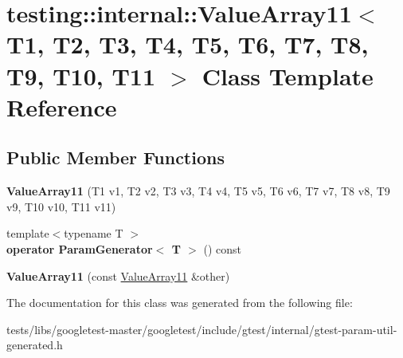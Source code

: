 \hypertarget{classtesting_1_1internal_1_1ValueArray11}{}\section{testing\+:\+:internal\+:\+:Value\+Array11$<$ T1, T2, T3, T4, T5, T6, T7, T8, T9, T10, T11 $>$ Class Template Reference}
\label{classtesting_1_1internal_1_1ValueArray11}
\subsection*{Public Member Functions}
\begin{DoxyCompactItemize}
\item 
\mbox{\label{classtesting_1_1internal_1_1ValueArray11_a2b26f49e7c5856e86f4fae360cd22d47}} 
{\bfseries Value\+Array11} (T1 v1, T2 v2, T3 v3, T4 v4, T5 v5, T6 v6, T7 v7, T8 v8, T9 v9, T10 v10, T11 v11)
\item 
\mbox{\label{classtesting_1_1internal_1_1ValueArray11_a3042498fcde8d1c91df474e618416f28}} 
{\footnotesize template$<$typename T $>$ }\\{\bfseries operator Param\+Generator$<$ T $>$} () const
\item 
\mbox{\label{classtesting_1_1internal_1_1ValueArray11_a09b4890b05313d04d98cbb5507d9b34e}} 
{\bfseries Value\+Array11} (const \hyperlink{classtesting_1_1internal_1_1ValueArray11}{Value\+Array11} \&other)
\end{DoxyCompactItemize}


The documentation for this class was generated from the following file\+:\begin{DoxyCompactItemize}
\item 
tests/libs/googletest-\/master/googletest/include/gtest/internal/gtest-\/param-\/util-\/generated.\+h\end{DoxyCompactItemize}
